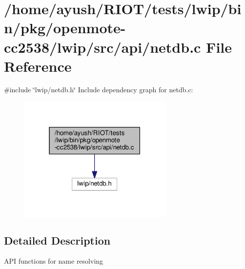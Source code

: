 \hypertarget{openmote-cc2538_2lwip_2src_2api_2netdb_8c}{}\section{/home/ayush/\+R\+I\+O\+T/tests/lwip/bin/pkg/openmote-\/cc2538/lwip/src/api/netdb.c File Reference}
\label{openmote-cc2538_2lwip_2src_2api_2netdb_8c}
{\ttfamily \#include \char`\"{}lwip/netdb.\+h\char`\"{}}\newline
Include dependency graph for netdb.\+c\+:
\nopagebreak
\begin{figure}[H]
\begin{center}
\leavevmode
\includegraphics[width=219pt]{openmote-cc2538_2lwip_2src_2api_2netdb_8c__incl}
\end{center}
\end{figure}


\subsection{Detailed Description}
A\+PI functions for name resolving 